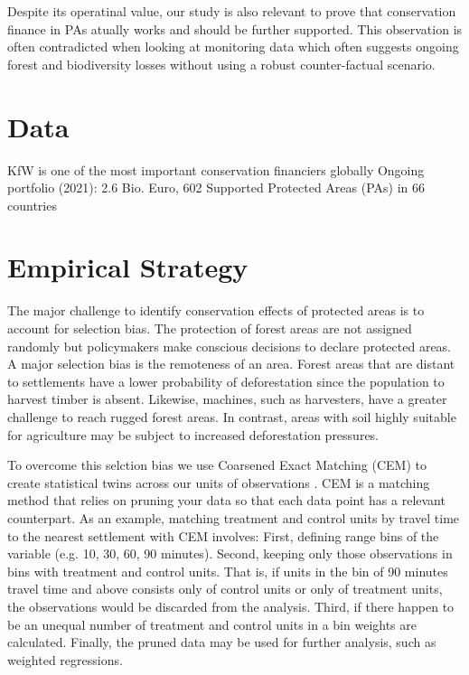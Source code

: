 \documentclass{article}
\begin{document}
Despite its operatinal value, our study is also relevant to prove that conservation finance in PAs atually works and should be further supported. This observation  is often contradicted when looking at monitoring data which often suggests ongoing forest and biodiversity losses without using a robust counter-factual scenario. 

\section{Data}
KfW is one of the most important conservation financiers globally
Ongoing portfolio (2021): 2.6 Bio. Euro, 602 Supported Protected Areas (PAs) in 66 countries



\section{Empirical Strategy}

The major challenge to identify conservation effects of protected areas is to account for selection bias. The protection of forest areas are not assigned randomly but policymakers make conscious decisions to declare protected areas. A major selection bias is the remoteness of an area. Forest areas that are distant to settlements have a lower probability of deforestation since the population to harvest timber is absent. Likewise, machines, such as harvesters, have a greater challenge to reach rugged forest areas. In contrast, areas with soil highly suitable for agriculture may be subject to increased deforestation pressures.

To overcome this selction bias we use Coarsened Exact Matching (CEM) to create statistical twins across our units of observations \citep{iacus2012causal, blackwell2009cem}. CEM is a matching method that relies on pruning your data so that each data point has a relevant counterpart. As an example, matching treatment and control units by travel time to the nearest settlement with CEM involves: First, defining range bins of the variable (e.g. 10, 30, 60, 90 minutes). Second, keeping only those observations in bins with treatment and control units. That is, if units in the bin of 90 minutes travel time and above consists only of control units or only of treatment units, the observations would be discarded from the analysis. Third, if there happen to be an unequal number of treatment and control units in a bin weights are calculated. Finally, the pruned data may be used for further analysis, such as weighted regressions.
\end{document}
